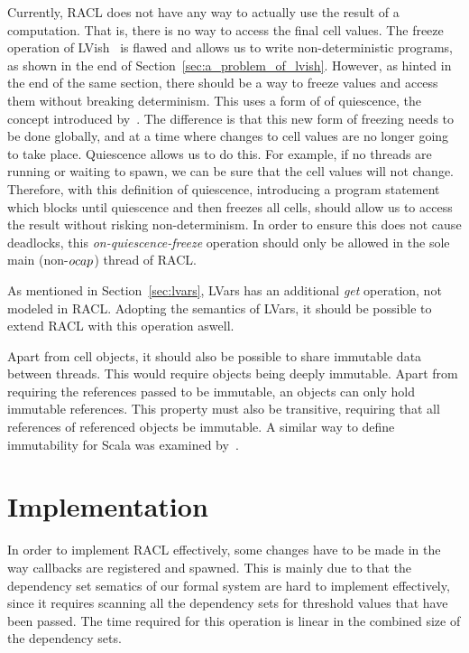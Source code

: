Currently, RACL does not have any way to actually use the result of a
computation. That is, there is no way to access the final cell values. The
freeze operation of LVish~\parencite{kuper2014freeze} is flawed and allows us to
write non-deterministic programs, as shown in the end of
Section~\ref{sec:a_problem_of_lvish}. However, as hinted in the end of the same
section, there should be a way to freeze values and access them without breaking
determinism.  This uses a form of of quiescence, the concept introduced
by~\textcite{kuper2014freeze}. The difference is that this new form of freezing
needs to be done globally, and at a time where changes to cell values are no
longer going to take place. Quiescence allows us to do this. For example, if no
threads are running or waiting to spawn, we can be sure that the cell values
will not change. Therefore, with this definition of quiescence, introducing a
program statement which blocks until quiescence and then freezes all cells,
should allow us to access the result without risking non-determinism. In order
to ensure this does not cause deadlocks, this \emph{on-quiescence-freeze}
operation should only be allowed in the sole main (non-$\mbox{$ocap$}$) thread of RACL.

As mentioned in Section~\ref{sec:lvars}, LVars has an additional \emph{get}
operation, not modeled in RACL. Adopting the semantics of LVars, it should be
possible to extend RACL with this operation aswell.

Apart from cell objects, it should also be possible to share immutable data
between threads. This would require objects being deeply immutable. Apart from
requiring the references passed to be immutable, an objects can only hold
immutable references. This property must also be transitive, requiring that all
references of referenced objects be immutable. A similar way to define
immutability for Scala was examined by~\textcite{HallerA17}.

\section{Implementation}%
\label{sec:implementation}

In order to implement RACL effectively, some changes have to be made in the way
callbacks are registered and spawned. This is mainly due to that the dependency
set sematics of our formal system are hard to implement effectively, since it
requires scanning all the dependency sets for threshold values that have been
passed. The time required for this operation is linear in the combined size of
the dependency sets.  


